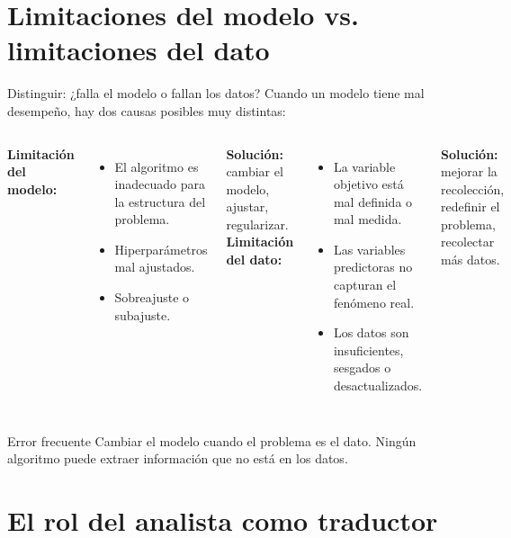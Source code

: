 \documentclass[aspectratio=169]{beamer}
\begin{document}
\section{Limitaciones del modelo vs. limitaciones del dato}

\begin{frame}{Distinguir: ¿falla el modelo o fallan los datos?}
  Cuando un modelo tiene mal desempeño, hay dos causas posibles muy distintas:

  \bigskip
  \begin{columns}
      \textbf{Limitación del modelo:}
      \begin{itemize}
        \item El algoritmo es inadecuado para la estructura del problema.
        \item Hiperparámetros mal ajustados.
        \item Sobreajuste o subajuste.
      \end{itemize}
      \bigskip
      \textbf{Solución:} cambiar el modelo, ajustar, regularizar.
      \textbf{Limitación del dato:}
      \begin{itemize}
        \item La variable objetivo está mal definida o mal medida.
        \item Las variables predictoras no capturan el fenómeno real.
        \item Los datos son insuficientes, sesgados o desactualizados.
      \end{itemize}
      \bigskip
      \textbf{Solución:} mejorar la recolección, redefinir el problema, recolectar más datos.
  \end{columns}

  \bigskip
  \begin{alertblock}{Error frecuente}
    Cambiar el modelo cuando el problema es el dato. Ningún algoritmo puede extraer información que no está en los datos.
  \end{alertblock}
\end{frame}

\section{El rol del analista como traductor}
\end{document}
